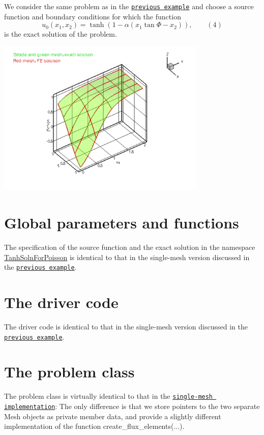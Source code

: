We consider the same problem as in the \href{../../two_d_poisson_flux_bc/html/index.html}{\tt previous example} and choose a source function and boundary conditions for which the function \[ u_0(x_1,x_2) = \tanh(1-\alpha(x_1 \tan\Phi - x_2)), \ \ \ \ \ \ \ \ \ (4) \] is the exact solution of the problem.

 
\begin{DoxyImage}
\includegraphics[width=0.75\textwidth]{soln}
\end{DoxyImage}




 

\hypertarget{index_global}{}\section{Global parameters and functions}\label{index_global}
The specification of the source function and the exact solution in the namespace {\ttfamily \hyperlink{namespaceTanhSolnForPoisson}{Tanh\+Soln\+For\+Poisson}} is identical to that in the single-\/mesh version discussed in the \href{../../two_d_poisson_flux_bc/html/index.html}{\tt previous example}.



 

\hypertarget{index_main}{}\section{The driver code}\label{index_main}
The driver code is identical to that in the single-\/mesh version discussed in the \href{../../two_d_poisson_flux_bc/html/index.html#main}{\tt previous example}.



 

\hypertarget{index_problem}{}\section{The problem class}\label{index_problem}
The problem class is virtually identical to that in the \href{../../two_d_poisson_flux_bc/html/index.html#problem}{\tt single-\/mesh implementation}\+: The only difference is that we store pointers to the two separate {\ttfamily Mesh} objects as private member data, and provide a slightly different implementation of the function {\ttfamily create\+\_\+flux\+\_\+elements}(...).

